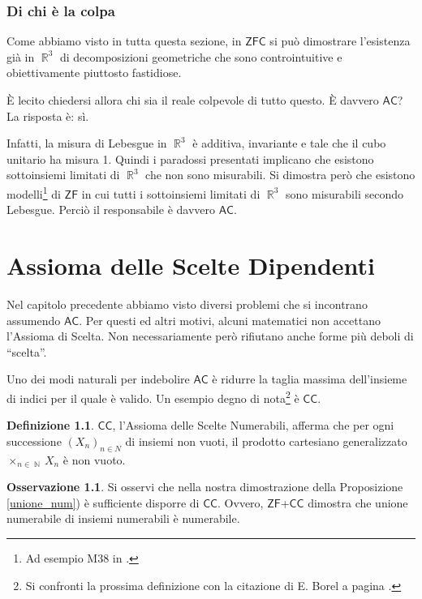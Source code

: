 \documentclass[12pt,a4paper]{report}
\theoremstyle{definition}
\newtheorem{defn}[teo]{Definizione}  %
\newtheorem{oss}[teo]{Osservazione}  %
\theoremstyle{num.custom-title}
\DeclareMathOperator{\N}{\mathbb{N}}
\DeclareMathOperator{\R}{\mathbb{R}}
\newcommand{\AC}{\ensuremath{\mathsf{AC}}\xspace}
\newcommand{\CC}{\ensuremath{\mathsf{CC}}\xspace}
\newcommand{\ZF}{\ensuremath{\mathsf{ZF}}\xspace}
\newcommand{\ZFC}{\ensuremath{\mathsf{ZFC}}\xspace}
\begin{document}
\subsection{Di chi è la colpa}

Come abbiamo visto in tutta questa sezione, in \ZFC si può dimostrare l'esistenza già in $\R^3$ di decomposizioni geometriche che sono controintuitive e obiettivamente piuttosto fastidiose.

È lecito chiedersi allora chi sia il reale colpevole di tutto questo. È davvero \AC? La risposta è: sì.

Infatti, la misura di Lebesgue in $\R^3$ è additiva, invariante e tale che il cubo unitario ha misura 1. Quindi i paradossi presentati implicano che esistono sottoinsiemi limitati di $\R^3$ che non sono misurabili. Si dimostra però che esistono modelli\footnote{Ad esempio M38 in \cite{HoRu98:Herrlich}.} di \ZF in cui tutti i sottoinsiemi limitati di $\R^3$ sono misurabili secondo Lebesgue. Perciò il responsabile è davvero \AC.



\chapter{Assioma delle Scelte Dipendenti}


Nel capitolo precedente abbiamo visto diversi problemi che si incontrano assumendo \AC. Per questi ed altri motivi, alcuni matematici non accettano l'Assioma di Scelta. Non necessariamente però rifiutano anche forme più deboli di ``scelta''.

Uno dei modi naturali per indebolire \AC è ridurre la taglia massima dell'insieme di indici per il quale è valido.  Un esempio degno di nota\footnote{Si confronti la prossima definizione con la citazione di E. Borel a pagina \pageref{cit_borel}.} è \CC.

\begin{defn}
\CC, l'Assioma delle Scelte Numerabili, afferma che per ogni successione $(X_n)_{n \in N}$ di insiemi non vuoti, il prodotto cartesiano generalizzato $\times_{n \in \N} X_n$ è non vuoto.
\end{defn}

\begin{oss}\label{oss_cc_unione_num}
Si osservi che nella nostra dimostrazione della Proposizione \ref{unione_num}) è sufficiente disporre di \CC. Ovvero, \ZF+\CC dimostra che unione numerabile di insiemi numerabili è numerabile.
\end{oss}
\end{document}
